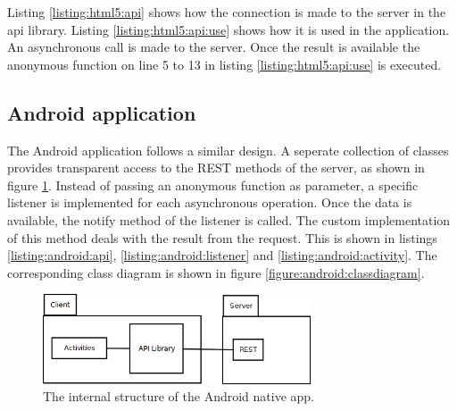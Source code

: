Listing \ref{listing:html5:api} shows how the connection is made to the server in the api library. Listing \ref{listing:html5:api:use} shows how it is used in the application. An asynchronous call is made to the server. Once the result is available the anonymous function on line 5 to 13 in listing \ref{listing:html5:api:use} is executed.

%

%




\subsection{Android application}

The Android application follows a similar design. A seperate collection of classes provides transparent access to the REST methods of the server, as shown in figure \ref{figure:android:architecture}. Instead of passing an anonymous function as parameter, a specific listener is implemented for each asynchronous operation. Once the data is available, the notify method of the listener is called. The custom implementation of this method deals with the result from the request. This is shown in listings \ref{listing:android:api}, \ref{listing:android:listener} and \ref{listing:android:activity}. The corresponding class diagram is shown in figure \ref{figure:android:classdiagram}.

\begin{figure}
	\begin{center}
		\includegraphics[width=300px]{img/android_architecture}
		\caption{The internal structure of the Android native app.}
		\label{figure:android:architecture}
	\end{center}
\end{figure}

